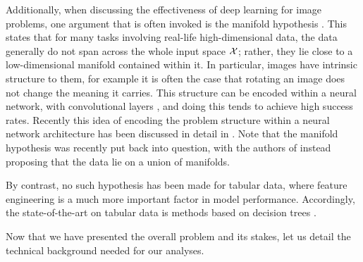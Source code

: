 \documentclass[../main.tex]{subfiles}
\begin{document}
Additionally, when discussing the effectiveness of deep learning for image problems, one argument that is often invoked is the manifold hypothesis \cite{bengioRepresentation2013}.
This states that for many tasks involving real-life high-dimensional data, the data generally do not span across the whole input space $\mathcal{X}$; rather, they lie close to a low-dimensional manifold contained within it.
In particular, images have intrinsic structure to them, for example it is often the case that rotating an image does not change the meaning it carries.
This structure can be encoded within a neural network, \eg{} with convolutional layers \cite{zhangShiftinvariant1988, lecunBackpropagation1989}, and doing this tends to achieve high success rates.
Recently this idea of encoding the problem structure within a neural network architecture has been discussed in detail in \cite{bronsteinGeometric2021}.
Note that the manifold hypothesis was recently put back into question, with the authors of \cite{brownUnion2022} instead proposing that the data lie on a union of manifolds.

By contrast, no such hypothesis has been made for tabular data, where feature engineering is a much more important factor in model performance.
Accordingly, the state-of-the-art on tabular data is methods based on decision trees \cite{shwartz-zivTabular2022}.

Now that we have presented the overall problem and its stakes, let us detail the technical background needed for our analyses.
\end{document}
